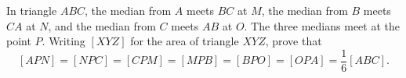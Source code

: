 In triangle $ABC$, the median from $A$ meets $BC$ at $M$, the median from $B$ meets $CA$ at $N$, and the median from $C$ meets $AB$ at $O$. The three medians meet at the point $P$. Writing $[XYZ]$ for the area of triangle $XYZ$, prove that
\[[APN]=[NPC]=[CPM]=[MPB]=[BPO]=[OPA]=\dfrac16[ABC].\]
